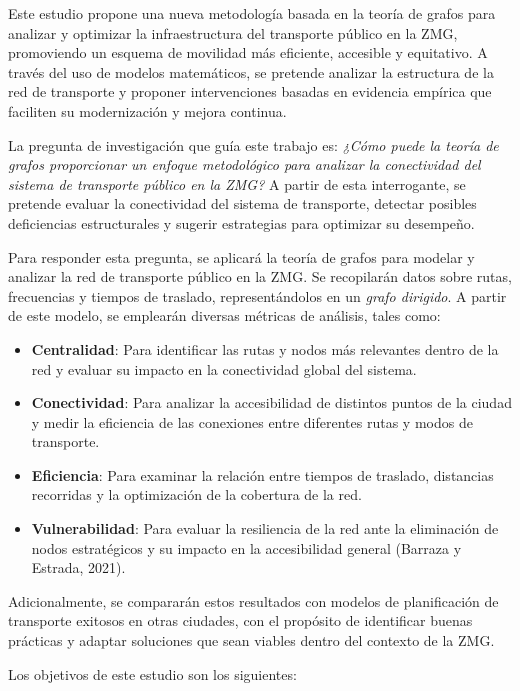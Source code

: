 \documentclass[openany]{book}
\begin{document}
	Este estudio propone una nueva metodología basada en la teoría de grafos para analizar y optimizar la infraestructura del transporte público en la ZMG, promoviendo un esquema de movilidad más eficiente, accesible y equitativo. A través del uso de modelos matemáticos, se pretende analizar la estructura de la red de transporte y proponer intervenciones basadas en evidencia empírica que faciliten su modernización y mejora continua.

	La pregunta de investigación que guía este trabajo es: \textit{¿Cómo puede la teoría de grafos proporcionar un enfoque metodológico para analizar la conectividad del sistema de transporte público en la ZMG?} A partir de esta interrogante, se pretende evaluar la conectividad del sistema de transporte, detectar posibles deficiencias estructurales y sugerir estrategias para optimizar su desempeño.

	Para responder esta pregunta, se aplicará la teoría de grafos para modelar y analizar la red de transporte público en la ZMG. Se recopilarán datos sobre rutas, frecuencias y tiempos de traslado, representándolos en un \textit{grafo dirigido}. A partir de este modelo, se emplearán diversas métricas de análisis, tales como:

	\begin{itemize}
		\item \textbf{Centralidad}: Para identificar las rutas y nodos más relevantes dentro de la red y evaluar su impacto en la conectividad global del sistema.
		\item \textbf{Conectividad}: Para analizar la accesibilidad de distintos puntos de la ciudad y medir la eficiencia de las conexiones entre diferentes rutas y modos de transporte.
		\item \textbf{Eficiencia}: Para examinar la relación entre tiempos de traslado, distancias recorridas y la optimización de la cobertura de la red.
		\item \textbf{Vulnerabilidad}: Para evaluar la resiliencia de la red ante la eliminación de nodos estratégicos y su impacto en la accesibilidad general (Barraza y Estrada, 2021).
	\end{itemize}

	Adicionalmente, se compararán estos resultados con modelos de planificación de transporte exitosos en otras ciudades, con el propósito de identificar buenas prácticas y adaptar soluciones que sean viables dentro del contexto de la ZMG.

	Los objetivos de este estudio son los siguientes:
\end{document}
